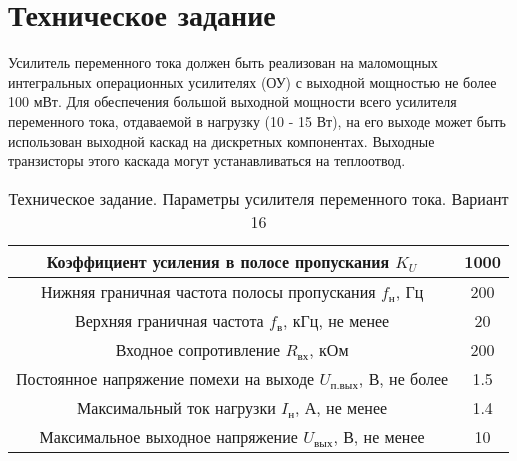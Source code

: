 \section*{Техническое задание}

Усилитель переменного тока должен быть реализован 
на маломощных интегральных операционных усилителях (ОУ) 
с выходной мощностью не более 100 мВт. 
Для обеспечения большой выходной мощности всего усилителя 
переменного тока, отдаваемой в нагрузку (10 - 15 Вт), 
на его выходе может быть использован выходной каскад на 
дискретных компонентах. Выходные транзисторы этого 
каскада могут устанавливаться на теплоотвод.

\begin{table}[H]
    \centering
    \begin{tabular}{|c|c|}
        \hline
        Коэффициент усиления в полосе пропускания $ K_U $ & 1000 \\
        \hline
        Нижняя граничная частота полосы пропускания $ f_н $, Гц & 200 \\
        \hline
        Верхняя граничная частота $ f_в $, кГц, не менее & 20 \\
        \hline
        Входное сопротивление $ R_{вх} $, кОм & 200 \\
        \hline
        Постоянное напряжение помехи на выходе $ U_{п.вых} $, В, не более & 1.5 \\
        \hline
        Максимальный ток нагрузки $ I_н $, А, не менее & 1.4 \\
        \hline
        Максимальное выходное напряжение $ U_{вых} $, В, не менее & 10 \\
        \hline
    \end{tabular}
    \caption{Техническое задание. Параметры усилителя переменного тока. Вариант 16}
    \label{tab:technical_task}
\end{table}
